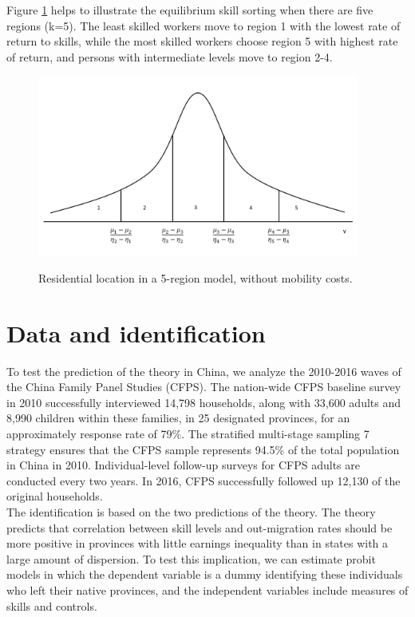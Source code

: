 \documentclass{article}
\begin{document}
Figure \ref{pic1} helps to illustrate the equilibrium skill sorting when there are five regions (k=5). The least skilled workers move to region 1 with the lowest rate of return to skills, while the most skilled workers choose region 5 with highest rate of return, and persons with intermediate levels move to region 2-4.

\begin{figure}[H]
  \centering
  \includegraphics[width=300pt]{Bell.png}\\
  \caption{Residential location in a 5-region model, without mobility costs.}\label{pic1}
\end{figure}

\section{Data and identification}\label{fourth_section}

To test the prediction of the theory in China, we analyze the 2010-2016 waves of the China Family Panel Studies (CFPS). The nation-wide CFPS baseline survey in 2010 successfully interviewed 14,798 households, along with 33,600 adults and 8,990 children within these families, in 25 designated provinces, for an approximately response rate of 79\%. The stratified multi-stage sampling 7 strategy ensures that the CFPS sample represents 94.5\% of the total population in China in 2010. Individual-level follow-up surveys for CFPS adults are conducted every two years. In 2016, CFPS successfully followed up 12,130 of the original households.\\

The identification is based on the two predictions of the theory. The theory predicts that correlation between skill levels and out-migration rates should be more positive in provinces with little earnings inequality than in states with a large amount of dispersion. To test this implication, we can estimate probit models in which the dependent variable is a dummy identifying these individuals who left their native provinces, and the independent variables include measures of skills and controls. \\
\end{document}
